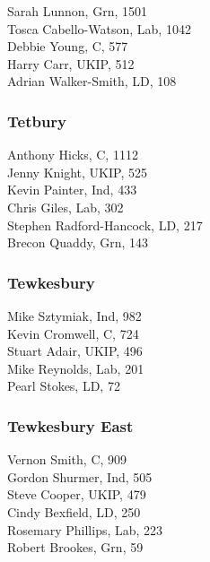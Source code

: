 \documentclass[a4paper,openany,10pt]{book}
\begin{document}
Sarah Lunnon, Grn, 1501\\
Tosca Cabello-Watson, Lab, 1042\\
Debbie Young, C, 577\\
Harry Carr, UKIP, 512\\
Adrian Walker-Smith, LD, 108\\


\subsubsection*{Tetbury}



Anthony Hicks, C, 1112\\
Jenny Knight, UKIP, 525\\
Kevin Painter, Ind, 433\\
Chris Giles, Lab, 302\\
{Stephen Radford-Hancock}, LD, 217\\
Brecon Quaddy, Grn, 143\\


\subsubsection*{Tewkesbury}



Mike Sztymiak, Ind, 982\\
Kevin Cromwell, C, 724\\
Stuart Adair, UKIP, 496\\
Mike Reynolds, Lab, 201\\
Pearl Stokes, LD, 72\\


\subsubsection*{Tewkesbury East}



Vernon Smith, C, 909\\
Gordon Shurmer, Ind, 505\\
Steve Cooper, UKIP, 479\\
Cindy Bexfield, LD, 250\\
Rosemary Phillips, Lab, 223\\
Robert Brookes, Grn, 59\\
\end{document}
